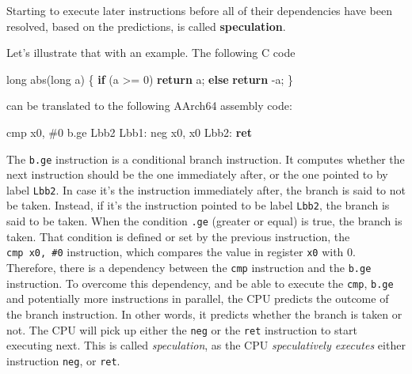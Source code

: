 \documentclass[
  a4paper,
]{report}
\newenvironment{Shaded}{}{}
\newcommand{\BuiltInTok}[1]{\textcolor[rgb]{0.00,0.50,0.00}{#1}}
\newcommand{\ControlFlowTok}[1]{\textcolor[rgb]{0.00,0.44,0.13}{\textbf{#1}}}
\newcommand{\DataTypeTok}[1]{\textcolor[rgb]{0.56,0.13,0.00}{#1}}
\newcommand{\DecValTok}[1]{\textcolor[rgb]{0.25,0.63,0.44}{#1}}
\newcommand{\FunctionTok}[1]{\textcolor[rgb]{0.02,0.16,0.49}{#1}}
\newcommand{\NormalTok}[1]{#1}
\newcommand{\OperatorTok}[1]{\textcolor[rgb]{0.40,0.40,0.40}{#1}}
\begin{document}
Starting to execute later instructions before all of their dependencies
have been resolved, based on the predictions, is called
\textbf{\label{__index_entry_171}{speculation}}.

Let's illustrate that with an example. The following C code

\begin{Shaded}
\begin{Highlighting}[]
\DataTypeTok{long}\NormalTok{ abs}\OperatorTok{(}\DataTypeTok{long}\NormalTok{ a}\OperatorTok{)} \OperatorTok{\{}
  \ControlFlowTok{if} \OperatorTok{(}\NormalTok{a }\OperatorTok{\textgreater{}=} \DecValTok{0}\OperatorTok{)}
    \ControlFlowTok{return}\NormalTok{ a}\OperatorTok{;}
  \ControlFlowTok{else}
    \ControlFlowTok{return} \OperatorTok{{-}}\NormalTok{a}\OperatorTok{;}
\OperatorTok{\}}
\end{Highlighting}
\end{Shaded}

can be translated to the following AArch64 assembly code:

\begin{Shaded}
\begin{Highlighting}[]
        \BuiltInTok{cmp}\NormalTok{     x0}\OperatorTok{,} \OperatorTok{\#}\DecValTok{0}
\NormalTok{        b}\OperatorTok{.}\NormalTok{ge    Lbb2}
\FunctionTok{Lbb1:}
        \BuiltInTok{neg}\NormalTok{     x0}\OperatorTok{,}\NormalTok{ x0}
\FunctionTok{Lbb2:}
        \ControlFlowTok{ret}
\end{Highlighting}
\end{Shaded}

The \texttt{b.ge} instruction is a conditional branch instruction. It
computes whether the next instruction should be the one immediately
after, or the one pointed to by label \texttt{Lbb2}. In case it's the
instruction immediately after, the branch is said to not be taken.
Instead, if it's the instruction pointed to be label \texttt{Lbb2}, the
branch is said to be taken. When the condition \texttt{.ge} (greater or
equal) is true, the branch is taken. That condition is defined or set by
the previous instruction, the \texttt{cmp\ x0,\ \#0} instruction, which
compares the value in register \texttt{x0} with 0. Therefore, there is a
dependency between the \texttt{cmp} instruction and the \texttt{b.ge}
instruction. To overcome this dependency, and be able to execute the
\texttt{cmp}, \texttt{b.ge} and potentially more instructions in
parallel, the CPU predicts the outcome of the branch instruction. In
other words, it predicts whether the branch is taken or not. The CPU
will pick up either the \texttt{neg} or the \texttt{ret} instruction to
start executing next. This is called \emph{speculation}, as the CPU
\emph{speculatively executes} either instruction \texttt{neg}, or
\texttt{ret}.
\end{document}

